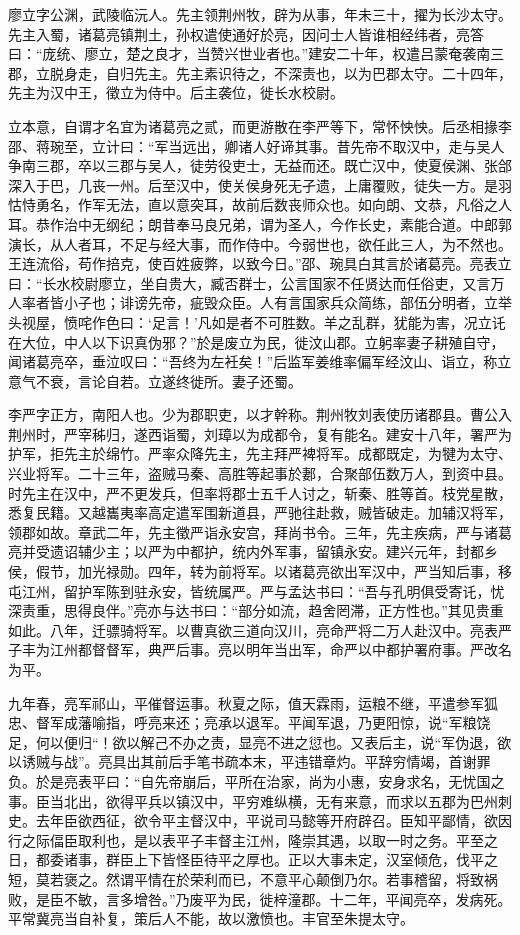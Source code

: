 \documentclass[12pt,UTF8]{ctexbook}
\begin{document}
廖立字公渊，武陵临沅人。先主领荆州牧，辟为从事，年未三十，擢为长沙太守。先主入蜀，诸葛亮镇荆土，孙权遣使通好於亮，因问士人皆谁相经纬者，亮答曰：“庞统、廖立，楚之良才，当赞兴世业者也。”建安二十年，权遣吕蒙奄袭南三郡，立脱身走，自归先主。先主素识待之，不深责也，以为巴郡太守。二十四年，先主为汉中王，徵立为侍中。后主袭位，徙长水校尉。

立本意，自谓才名宜为诸葛亮之贰，而更游散在李严等下，常怀怏怏。后丞相掾李邵、蒋琬至，立计曰：“军当远出，卿诸人好谛其事。昔先帝不取汉中，走与吴人争南三郡，卒以三郡与吴人，徒劳役吏士，无益而还。既亡汉中，使夏侯渊、张郃深入于巴，几丧一州。后至汉中，使关侯身死无孑遗，上庸覆败，徒失一方。是羽怙恃勇名，作军无法，直以意突耳，故前后数丧师众也。如向朗、文恭，凡俗之人耳。恭作治中无纲纪；朗昔奉马良兄弟，谓为圣人，今作长史，素能合道。中郎郭演长，从人者耳，不足与经大事，而作侍中。今弱世也，欲任此三人，为不然也。王连流俗，苟作掊克，使百姓疲弊，以致今日。”邵、琬具白其言於诸葛亮。亮表立曰：“长水校尉廖立，坐自贵大，臧否群士，公言国家不任贤达而任俗吏，又言万人率者皆小子也；诽谤先帝，疵毁众臣。人有言国家兵众简练，部伍分明者，立举头视屋，愤咤作色曰：‘足言！’凡如是者不可胜数。羊之乱群，犹能为害，况立讬在大位，中人以下识真伪邪？”於是废立为民，徙汶山郡。立躬率妻子耕殖自守，闻诸葛亮卒，垂泣叹曰：“吾终为左衽矣！”后监军姜维率偏军经汶山、诣立，称立意气不衰，言论自若。立遂终徙所。妻子还蜀。

李严字正方，南阳人也。少为郡职吏，以才幹称。荆州牧刘表使历诸郡县。曹公入荆州时，严宰秭归，遂西诣蜀，刘璋以为成都令，复有能名。建安十八年，署严为护军，拒先主於绵竹。严率众降先主，先主拜严裨将军。成都既定，为犍为太守、兴业将军。二十三年，盗贼马秦、高胜等起事於郪，合聚部伍数万人，到资中县。时先主在汉中，严不更发兵，但率将郡士五千人讨之，斩秦、胜等首。枝党星散，悉复民籍。又越巂夷率高定遣军围新道县，严驰往赴救，贼皆破走。加辅汉将军，领郡如故。章武二年，先主徵严诣永安宫，拜尚书令。三年，先主疾病，严与诸葛亮并受遗诏辅少主；以严为中都护，统内外军事，留镇永安。建兴元年，封都乡侯，假节，加光禄勋。四年，转为前将军。以诸葛亮欲出军汉中，严当知后事，移屯江州，留护军陈到驻永安，皆统属严。严与孟达书曰：“吾与孔明俱受寄讬，忧深责重，思得良伴。”亮亦与达书曰：“部分如流，趋舍罔滞，正方性也。”其见贵重如此。八年，迁骠骑将军。以曹真欲三道向汉川，亮命严将二万人赴汉中。亮表严子丰为江州都督督军，典严后事。亮以明年当出军，命严以中都护署府事。严改名为平。

九年春，亮军祁山，平催督运事。秋夏之际，值天霖雨，运粮不继，平遣参军狐忠、督军成藩喻指，呼亮来还；亮承以退军。平闻军退，乃更阳惊，说“军粮饶足，何以便归“！欲以解己不办之责，显亮不进之愆也。又表后主，说“军伪退，欲以诱贼与战”。亮具出其前后手笔书疏本末，平违错章灼。平辞穷情竭，首谢罪负。於是亮表平曰：“自先帝崩后，平所在治家，尚为小惠，安身求名，无忧国之事。臣当北出，欲得平兵以镇汉中，平穷难纵横，无有来意，而求以五郡为巴州刺史。去年臣欲西征，欲令平主督汉中，平说司马懿等开府辟召。臣知平鄙情，欲因行之际偪臣取利也，是以表平子丰督主江州，隆崇其遇，以取一时之务。平至之日，都委诸事，群臣上下皆怪臣待平之厚也。正以大事未定，汉室倾危，伐平之短，莫若褒之。然谓平情在於荣利而已，不意平心颠倒乃尔。若事稽留，将致祸败，是臣不敏，言多增咎。”乃废平为民，徙梓潼郡。十二年，平闻亮卒，发病死。平常冀亮当自补复，策后人不能，故以激愤也。丰官至朱提太守。
\end{document}
